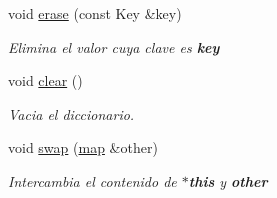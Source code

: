 \begin{Indent}
\begin{DoxyCompactItemize}
void \hyperlink{classaed2_1_1map_a2ffadb42cd5f0bc7b3752ff159b75334_a2ffadb42cd5f0bc7b3752ff159b75334}{erase} (const Key \&key)
\begin{DoxyCompactList}\small\item\em Elimina el valor cuya clave es {\bfseries key} \end{DoxyCompactList}\item 
void \hyperlink{classaed2_1_1map_a2bfa5165825979bf2431db55bc6bc9ca_a2bfa5165825979bf2431db55bc6bc9ca}{clear} ()
\begin{DoxyCompactList}\small\item\em Vacia el diccionario. \end{DoxyCompactList}\item 
void \hyperlink{classaed2_1_1map_a43ddb71cc91e5c6021a7a1f243d6cc4a_a43ddb71cc91e5c6021a7a1f243d6cc4a}{swap} (\hyperlink{classaed2_1_1map}{map} \&other)
\begin{DoxyCompactList}\small\item\em Intercambia el contenido de {\bfseries $\ast$this} y {\bfseries other} \end{DoxyCompactList}\end{DoxyCompactItemize}
\end{Indent}
